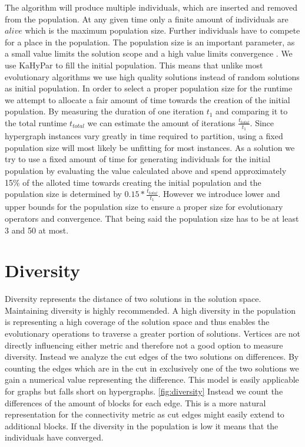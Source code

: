 \documentclass[a4paper,12pt,bibtotoc,titlepage, liststotoc,BCOR7mm,headsepline,pointlessnumbers]{scrbook}
\numberwithin{equation}{section}
\begin{document}
The algorithm will produce multiple individuals, which are inserted and removed from the population. At any given time only a finite amount of
individuals are $alive$ which is the maximum population size. Further individuals have to compete for a place in the population. 
The population size is an important parameter, as a small value limits the solution scope and a high value limits convergence \cite{chen2012large}.
We use KaHyPar to fill the initial population. This means that unlike most evolutionary algorithms we use high quality solutions instead of random solutions as initial population.
In order to select a proper population size for the runtime we attempt to allocate a fair amount of time towards the creation of the initial population. 
By measuring the duration of one iteration $t_1$ and comparing it to the total runtime ${t_{total}}$ we can estimate the amount of iterations $\frac{t_{total}}{t_1}$. Since hypergraph instances
vary greatly in time required to partition, using a fixed population size will most likely be unfitting for most instances. As a solution we try to use a fixed amount of time for generating 
individuals for the initial population by evaluating the value calculated above and spend approximately 15\% of the alloted time towards creating the initial population and the population size is determined by $0.15*\frac{t_{total}}{t_1}$.
However we introduce lower and upper bounds for the population size to ensure a proper size for evolutionary operators and convergence. That being said the population size has to be at least 3 and 50 at most.
\section{Diversity}
Diversity represents the distance of two solutions in the solution space. Maintaining diversity is highly recommended\cite{back1996evolutionary}.
A high diversity in the population is representing a high coverage of the solution space and 
thus enables the evolutionary operations to traverse a greater portion of solutions. 
Vertices are not directly influencing either metric and therefore not a good option to measure diversity. Instead we analyze the cut edges of the two solutions 
on differences. By counting the edges which are in the cut in exclusively one of the two solutions we gain a numerical value representing the difference. This model is easily applicable for 
graphs but falls short on hypergraphs. \ref{fig:diversity} Instead we count the differences of the amount of blocks for each edge. This is a more natural representation for the connectivity metric as cut edges might easily extend to additional blocks. If the diversity in the population is low it means that the individuals have converged.
\end{document}
